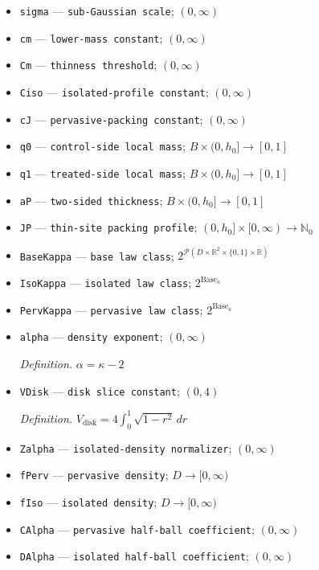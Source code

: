 \documentclass{article}
\begin{document}
\begin{itemize}
  \item \texttt{sigma} --- \texttt{sub-\allowbreak{}Gaussian scale}; \((0,\infty)\)
  \item \texttt{cm} --- \texttt{lower-\allowbreak{}mass constant}; \((0,\infty)\)
  \item \texttt{Cm} --- \texttt{thinness threshold}; \((0,\infty)\)
  \item \texttt{Ciso} --- \texttt{isolated-\allowbreak{}profile constant}; \((0,\infty)\)
  \item \texttt{cJ} --- \texttt{pervasive-\allowbreak{}packing constant}; \((0,\infty)\)
  \item \texttt{q0} --- \texttt{control-\allowbreak{}side local mass}; \(B\times(0,h_0]\to[0,1]\)
  \item \texttt{q1} --- \texttt{treated-\allowbreak{}side local mass}; \(B\times(0,h_0]\to[0,1]\)
  \item \texttt{aP} --- \texttt{two-\allowbreak{}sided thickness}; \(B\times(0,h_0]\to[0,1]\)
  \item \texttt{JP} --- \texttt{thin-\allowbreak{}site packing profile}; \((0,h_0]\times[0,\infty)\to\mathbb N_0\)
  \item \texttt{BaseKappa} --- \texttt{base law class}; \(2^{\mathcal P(D\times\mathbb R^2\times\{0,1\}\times\mathbb R)}\)
  \item \texttt{IsoKappa} --- \texttt{isolated law class}; \(2^{\mathrm{Base}_\kappa}\)
  \item \texttt{PervKappa} --- \texttt{pervasive law class}; \(2^{\mathrm{Base}_\kappa}\)
  \item \texttt{alpha} --- \texttt{density exponent}; \((0,\infty)\)
  \par\smallskip\noindent\emph{Definition.} \(\alpha=\kappa-2\)
  \item \texttt{VDisk} --- \texttt{disk slice constant}; \((0,4)\)
  \par\smallskip\noindent\emph{Definition.} \(V_{\mathrm{disk}}=4\int_0^1\sqrt{1-r^2}\,dr\)
  \item \texttt{Zalpha} --- \texttt{isolated-\allowbreak{}density normalizer}; \((0,\infty)\)
  \item \texttt{fPerv} --- \texttt{pervasive density}; \(D\to[0,\infty)\)
  \item \texttt{fIso} --- \texttt{isolated density}; \(D\to[0,\infty)\)
  \item \texttt{CAlpha} --- \texttt{pervasive half-\allowbreak{}ball coefficient}; \((0,\infty)\)
  \item \texttt{DAlpha} --- \texttt{isolated half-\allowbreak{}ball coefficient}; \((0,\infty)\)

\end{itemize}
\end{document}
